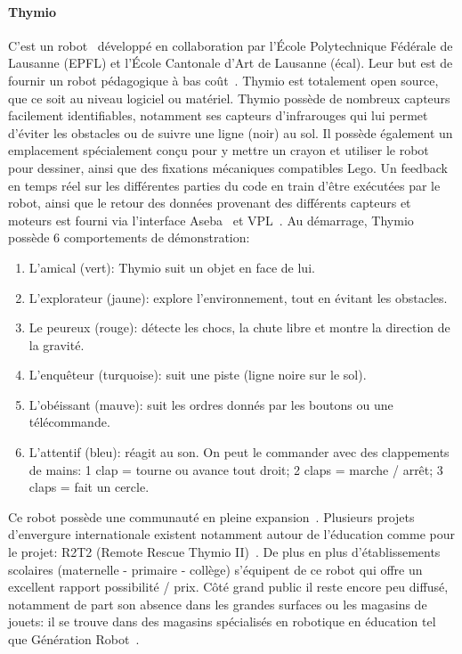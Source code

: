         \paragraph{Thymio}\label{sec:thymio}
            C'est un robot~ développé en collaboration par l’École Polytechnique Fédérale de Lausanne (EPFL) et l'École Cantonale d'Art de Lausanne (écal). Leur but est de fournir un robot pédagogique à bas coût~. Thymio est totalement open source, que ce soit au niveau logiciel ou matériel.
            Thymio possède de nombreux capteurs facilement identifiables, notamment ses capteurs d'infrarouges qui lui permet d'éviter les obstacles ou de suivre une ligne (noir) au sol.
            Il possède également un emplacement spécialement conçu pour y mettre un crayon et utiliser le robot pour dessiner, ainsi que des fixations mécaniques compatibles Lego.
            Un feedback en temps réel sur les différentes parties du code en train d’être exécutées par le robot, ainsi que le retour des données provenant des différents capteurs et moteurs est fourni via l'interface Aseba~ et VPL~.
            Au démarrage, Thymio possède 6 comportements de démonstration:
            \begin{enumerate}\myItemStyle
            \small
                \item L'amical (vert): Thymio suit un objet en face de lui.
                \item L'explorateur (jaune): explore l'environnement, tout en évitant les obstacles.
                \item Le peureux (rouge): détecte les chocs, la chute libre et montre la direction de la gravité.
                \item L'enquêteur (turquoise): suit une piste (ligne noire sur le sol).
                \item L'obéissant (mauve): suit les ordres donnés par les boutons ou une télécommande.
                \item L'attentif (bleu): réagit au son. On peut le commander avec des clappements de mains: 1 clap = tourne ou avance tout droit; 2 claps = marche / arrêt; 3 claps = fait un cercle.
            \end{enumerate}{}\par%
            Ce robot possède une communauté en pleine expansion~. Plusieurs projets d'envergure internationale existent notamment autour de l'éducation comme pour le projet: R2T2 (Remote Rescue Thymio II)~. De plus en plus d'établissements scolaires (maternelle - primaire - collège) s'équipent de ce robot qui offre un excellent rapport possibilité / prix. Côté grand public il reste encore peu diffusé, notamment de part son absence dans les grandes surfaces ou les magasins de jouets: il se trouve dans des magasins spécialisés en robotique \etou en éducation tel que Génération Robot~.
